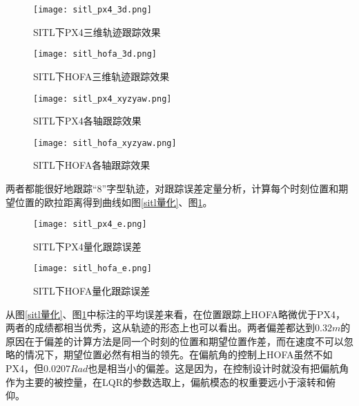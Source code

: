 \begin{figure}[htb]
  \centering
  \begin{minipage}[b]{0.49\linewidth}
      \texttt{[image: sitl\_px4\_3d.png]}
      \caption{SITL下PX4三维轨迹跟踪效果}
  \end{minipage}
  \hfill %
  \begin{minipage}[b]{0.49\linewidth}
      \texttt{[image: sitl\_hofa\_3d.png]}
      \caption{SITL下HOFA三维轨迹跟踪效果}
  \end{minipage}


  \begin{minipage}[b]{0.49\linewidth}
      \texttt{[image: sitl\_px4\_xyzyaw.png]}
      \caption{SITL下PX4各轴跟踪效果}
  \end{minipage}
  \hfill
  \begin{minipage}[b]{0.49\linewidth}
      \texttt{[image: sitl\_hofa\_xyzyaw.png]}
      \caption{SITL下HOFA各轴跟踪效果}
  \end{minipage}
\end{figure}

两者都能很好地跟踪“8”字型轨迹，对跟踪误差定量分析，计算每个时刻位置和期望位置的欧拉距离得到曲线如图\ref{sitl量化}、图\ref{sitl量化hofa}。

\begin{figure}[htb]
  \centering
  \begin{minipage}[b]{0.49\linewidth}
    \texttt{[image: sitl\_px4\_e.png]}
    \caption{SITL下PX4量化跟踪误差}
    \label{sitl量化}
\end{minipage}
\hfill
\begin{minipage}[b]{0.49\linewidth}
    \texttt{[image: sitl\_hofa\_e.png]}
    \caption{SITL下HOFA量化跟踪误差}
    \label{sitl量化hofa}
\end{minipage}

\end{figure}

从图\ref{sitl量化}、图\ref{sitl量化hofa}中标注的平均误差来看，在位置跟踪上HOFA略微优于PX4，两者的成绩都相当优秀，这从轨迹的形态上也可以看出。两者偏差都达到$0.32m$的原因在于偏差的计算方法是同一个时刻的位置和期望位置作差，而在速度不可以忽略的情况下，期望位置必然有相当的领先。在偏航角的控制上HOFA虽然不如PX4，但$0.0207 Rad$也是相当小的偏差。这是因为，在控制设计时就没有把偏航角作为主要的被控量，在LQR的参数选取上，偏航模态的权重要远小于滚转和俯仰。